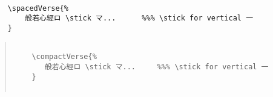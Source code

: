 \documentclass[letterpaper]{article}
\begin{document}
\begin{verbatim}

	\spacedVerse{%
		般若心經ロ \stick マ...      %%% \stick for vertical 一
	}

\end{verbatim}

\pagebreak

\vspace*{2cm}

\renewcommand{\kanji}{\centering\fontsize{25}{25}}
\begin{multicols}{7}
	\RLmulticolcolumns
\end{multicols}

\vspace*{1cm}

\begin{quotation}
	
	\begin{verbatim}
	
	\compactVerse{%
	   般若心經ロ \stick マ...     %%% \stick for vertical 一
	}
	
	\end{verbatim}
	
\end{quotation}
\end{document}

